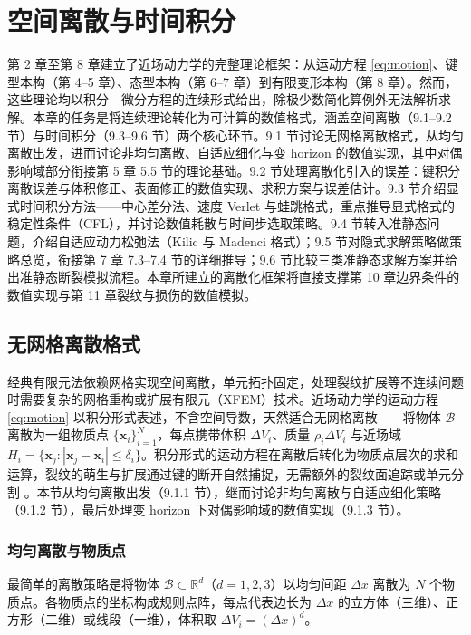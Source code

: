 \chapter{空间离散与时间积分}

第 2 章至第 8 章建立了近场动力学的完整理论框架：从运动方程 \eqref{eq:motion}、键型本构（第 4--5 章）、态型本构（第 6--7 章）到有限变形本构（第 8 章）。然而，这些理论均以积分—微分方程的连续形式给出，除极少数简化算例外无法解析求解。本章的任务是将连续理论转化为可计算的数值格式，涵盖空间离散（9.1--9.2 节）与时间积分（9.3--9.6 节）两个核心环节。9.1 节讨论无网格离散格式，从均匀离散出发，进而讨论非均匀离散、自适应细化与变 horizon 的数值实现，其中对偶影响域部分衔接第 5 章 5.5 节的理论基础。9.2 节处理离散化引入的误差：键积分离散误差与体积修正、表面修正的数值实现、求积方案与误差估计。9.3 节介绍显式时间积分方法——中心差分法、速度 Verlet 与蛙跳格式，重点推导显式格式的稳定性条件（CFL），并讨论数值耗散与时间步选取策略。9.4 节转入准静态问题，介绍自适应动力松弛法（Kilic 与 Madenci 格式）；9.5 节对隐式求解策略做策略总览，衔接第 7 章 7.3--7.4 节的详细推导；9.6 节比较三类准静态求解方案并给出准静态断裂模拟流程。本章所建立的离散化框架将直接支撑第 10 章边界条件的数值实现与第 11 章裂纹与损伤的数值模拟。

\section{无网格离散格式}\label{sec:disc-meshfree}

经典有限元法依赖网格实现空间离散，单元拓扑固定，处理裂纹扩展等不连续问题时需要复杂的网格重构或扩展有限元（XFEM）技术。近场动力学的运动方程 \eqref{eq:motion} 以积分形式表述，不含空间导数，天然适合无网格离散——将物体 $\mathcal{B}$ 离散为一组物质点 $\{\mathbf{x}_i\}_{i=1}^{N}$，每点携带体积 $\Delta V_i$、质量 $\rho_i\Delta V_i$ 与近场域 $H_i=\{\mathbf{x}_j:|\mathbf{x}_j-\mathbf{x}_i|\le\delta_i\}$。积分形式的运动方程在离散后转化为物质点层次的求和运算，裂纹的萌生与扩展通过键的断开自然捕捉，无需额外的裂纹面追踪或单元分割 \cite{Silling2000,SillingAskari2005}。本节从均匀离散出发（9.1.1 节），继而讨论非均匀离散与自适应细化策略（9.1.2 节），最后处理变 horizon 下对偶影响域的数值实现（9.1.3 节）。

\subsection{均匀离散与物质点}\label{sec:disc-uniform}

最简单的离散策略是将物体 $\mathcal{B}\subset\mathbb{R}^d$（$d=1,2,3$）以均匀间距 $\Delta x$ 离散为 $N$ 个物质点。各物质点的坐标构成规则点阵，每点代表边长为 $\Delta x$ 的立方体（三维）、正方形（二维）或线段（一维），体积取 $\Delta V_i=(\Delta x)^d$。

